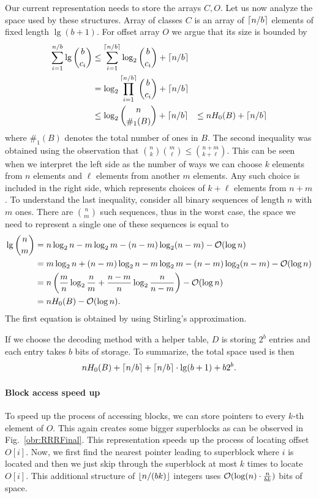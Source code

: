 Our current representation needs to store the arrays $C, O$. Let us now analyze the space used by these structures.
Array of classes $C$ is an array of $\left\lceil n/b \right\rceil$ elements of fixed length $\lg (b+1)$. For offset array $O$ we argue
that its size is bounded by
\begin{align*}
    \sum_{i=1}^{n/b} \mathop{\mathrm{lg}} {b\choose c_i}
    &\leq \sum_{i=1}^{\left\lceil n/b \right\rceil} \log_2 {b\choose c_i} + \left\lceil n/b \right\rceil \\
    &= \log_2\prod_{i=1}^{\left\lceil n/b \right\rceil} {b\choose c_i} + \left\lceil n/b \right\rceil \\
    &\leq \log_2{n\choose \#_1(B)} + \left\lceil n/b \right\rceil &\leq nH_0(B) + \left\lceil n/b \right\rceil
\end{align*}
where $\#_1(B)$ denotes the total number of ones in $B$. The second inequality was obtained using
the observation that ${n\choose k} {m\choose \ell} \leq {n+m\choose k+\ell}$. This can be seen
when we interpret the left side as the number of ways we can choose $k$ elements
from $n$ elements and $\ell$ elements from another $m$ elements. Any such choice is included in the
right side, which represents choices of $k+\ell$ elements from $n+m$. To understand the last inequality,
consider all binary sequences of length $n$ with $m$ ones. There are ${n\choose m}$ such sequences,
thus in the worst case, the space we need to represent a single one of these sequences is equal to
\begin{align*}
    \mathop{\mathrm{lg}}{n\choose m}
    &= n\log_2 n - m\log_2 m - (n-m)\log_2 (n-m) - \mathcal{O}(\log n) \\
    &= m\log_2 n + (n-m)\log_2 n - m\log_2 m - (n-m)\log_2 (n-m) - \mathcal{O}(\log n) \\
    &= n\left(\frac{m}{n}\log_2\frac{n}{m} + \frac{n-m}{n}\log_2\frac{n}{n-m}\right)-\mathcal{O}(\log n) \\
    &= nH_0(B) - \mathcal{O}(\log n).
\end{align*}
The first equation is obtained by using Stirling's approximation.

If we choose the decoding method with a helper table, $D$ is storing $2^b$ entries and each entry takes
$b$ bits of storage. To summarize, the total space used is then
$$nH_0(B) + \left\lceil n/b \right\rceil + \left\lceil n/b \right\rceil \cdot \mathop{\mathrm{lg}}(b+1) + b2^b.$$

\paragraph{Block access speed up}

To speed up the process of accessing blocks, we can store pointers to every $k$-th element
of $O$. This again creates some bigger superblocks as can be observed in Fig.~\ref{obr:RRRFinal}.
This representation speeds up the process of locating offset $O[i]$. Now, we first find the
nearest pointer leading to superblock where $i$ is located and then we just skip through the superblock
at most $k$ times to locate $O[i]$. This additional structure of $\left\lfloor n/(bk) \right\rfloor$ integers uses
$\mathcal{O}(\log(n)\cdot \frac{n}{bk})$ bits of space.

